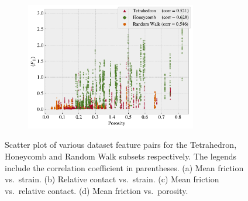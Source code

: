 \begin{figure}[H]
\begin{subfigure}[t]{0.49\textwidth}
      \caption{}
  \end{subfigure}
  \hfill
  \begin{subfigure}[t]{0.49\textwidth}
      \centering
      \raggedright
      \includegraphics[width=0.82\textwidth]{figures/ML/corr_porosity_Ff.pdf}
      \caption{}
  \end{subfigure}
  \hfill
     \caption{Scatter plot of various dataset feature pairs for the Tetrahedron, Honeycomb and Random Walk subsets respectively. The legends include the correlation coefficient in parentheses. (a) Mean friction vs.\ strain. (b) Relative contact vs.\ strain. (c) Mean friction vs.\ relative contact. (d) Mean friction vs.\ porosity.}
     \label{fig:corr_vis}
\end{figure}

